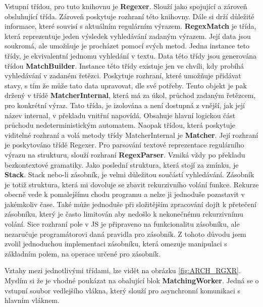 Vstupní třídou, pro tuto knihovnu je \textbf{Regexer}. 
Slouží jako spojující a zároveň obsluhující třída. 
Zároveň poskytuje rozhraní této knihovny.
Dále si drží důležité informace, které souvisí s aktuálním regulárním výrazem.
\textbf{RegexMatch} je třída, která reprezentuje jeden výsledek vyhledávání zadaným výrazem.
Její data jsou soukromá, ale umožňuje je procházet pomocí svých metod.
Jedna instance teto třídy, je ekvivalentní jednomu vyhledání v textu.
Data této třídy jsou generována třídou \textbf{MatchBuilder}.
Instance této třídy existuje jen ve chvíli, kdy probíhá vyhledávání v zadaném řetězci.
Poskytuje rozhraní, které umožňuje přidávat stavy, s tím že může tato data upravovat, dle své potřeby.
Tento objekt je pak držený v třídě \textbf{MatcherInternal}, 
která má za úkol, průchod zadaným řetězcem, pro konkrétní výraz.
Tato třída, je izolována a není dostupná z vnější, jak její název internal, v překladu vnitřní napovídá.
Obsahuje hlavní logickou část průchodu nedeterministickým automatem.
Naopak třídou, která poskytuje viditelné rozhraní a volá metody třídy MatcherInternal je \textbf{Matcher}.
Její rozhraní je poskytováno třídě Regexer.
Pro parsování textové reprezentace regulárního výrazu na strukturu, slouží rozhraní \textbf{RegexParser}.
Vzniká vždy po překladu bezkontextové gramatiky.
Jako poslední struktura, která stojí za zmínku, je \textbf{Stack}.
Stack nebo-li zásobník, je velmi důležitou součástí vyhledávání.
Zásobník je totiž struktura, která mi dovoluje se zbavit rekurzivního volání funkce.
Rekurze obecně vede k pomalejšímu chodu programu a nelze ji jednoduše pozastavit v jakémkoliv čase.
Také může jednoduše při složitějším zpracování dojít k přetečení zásobníku, který je často limitován aby nedošlo k nekonečnému rekurzivnímu volání.
Sice rozhraní pole v JS je připraveno na funkcionalitu zásobníku, ale nezaručuje programátorovi daná pravidla pro zásobník. 
Z tohoto důvodu jsem zvolil jednoduchou implementaci zásobníku, která omezuje manipulaci s základním polem, na operace určené pro zásobník.

Vztahy mezi jednotlivými třídami, lze vidět na obrázku \ref{fig:ARCH_RGXR}. 
Myslím si že je vhodné poukázat na obalující blok \textbf{MatchingWorker}.
Jedná se o vstupní soubor vedlejšího vlákna, který slouží pro asynchronní komunikaci s hlavním vláknem.



